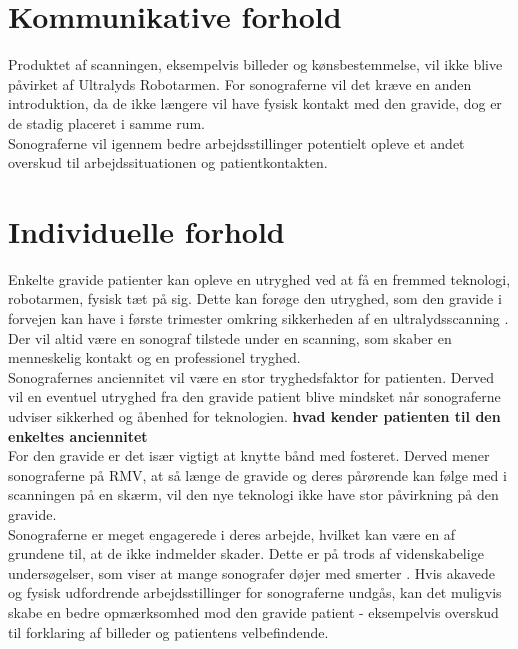 \section{Kommunikative forhold}
Produktet af scanningen, eksempelvis billeder og kønsbestemmelse, vil ikke blive påvirket af Ultralyds Robotarmen.
For sonograferne vil det kræve en anden introduktion, da de ikke længere vil have fysisk kontakt med den gravide, dog er de stadig placeret i samme rum.  \\
Sonograferne vil igennem bedre arbejdsstillinger potentielt opleve et andet overskud til arbejdssituationen og patientkontakten.  

\section{Individuelle forhold}
Enkelte gravide patienter kan opleve en utryghed ved at få en fremmed teknologi, robotarmen, fysisk tæt på sig. Dette kan forøge den utryghed, som den gravide i forvejen kan have i første trimester omkring sikkerheden af en ultralydsscanning \cite{Lea1985}. Der vil altid være en sonograf tilstede under en scanning, som skaber en menneskelig kontakt og en professionel tryghed.  \\
Sonografernes anciennitet vil være en stor tryghedsfaktor for patienten. Derved vil en eventuel utryghed fra den gravide patient blive mindsket når sonograferne udviser sikkerhed og åbenhed for teknologien. \textbf{hvad kender patienten til den enkeltes anciennitet}\\
For den gravide er det især vigtigt at knytte bånd med fosteret. Derved mener sonograferne på RMV, at så længe de gravide og deres pårørende kan følge med i scanningen på en skærm, vil den nye teknologi ikke have stor påvirkning på den gravide. \\  
Sonograferne er meget engagerede i deres arbejde, hvilket kan være en af grundene til, at de ikke indmelder skader. Dette er på trods af videnskabelige undersøgelser, som viser at mange sonografer døjer med smerter \cite{BeckyMorton2007}. 
Hvis akavede og fysisk udfordrende arbejdsstillinger for sonograferne undgås, kan det muligvis skabe en bedre opmærksomhed mod den gravide patient - eksempelvis overskud til forklaring af billeder og patientens velbefindende.  

